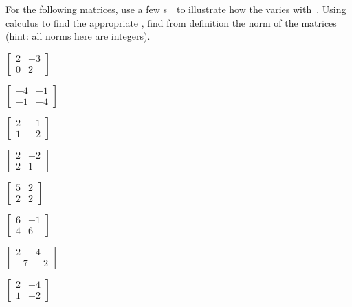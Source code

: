 \begin{exercise} 
For the following matrices, use a few s~\xv\ to illustrate how the  varies with~\xv.
Using calculus to find the appropriate , find from definition the norm of the matrices (hint: all norms here are integers).
\begin{Parts}
\item \(\begin{bmatrix} 2&-3\\0&2 \end{bmatrix}\)
\item \(\begin{bmatrix} -4&-1\\-1&-4 \end{bmatrix}\)
\item \(\begin{bmatrix} 2&-1\\1&-2 \end{bmatrix}\)
\item \(\begin{bmatrix} 2&-2\\2&1 \end{bmatrix}\)
\begin{reduce}
\item \(\begin{bmatrix} 5&2\\2&2 \end{bmatrix}\)
\item \(\begin{bmatrix} 6&-1\\4&6 \end{bmatrix}\)
\item \(\begin{bmatrix} 2&4\\-7&-2 \end{bmatrix}\)
\item \(\begin{bmatrix} 2&-4\\1&-2 \end{bmatrix}\)
\end{reduce}
\end{Parts}

\end{exercise}




